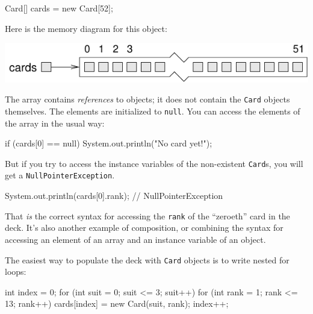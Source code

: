 \documentclass[12pt]{book}
\theoremstyle{exercise}
\newcommand{\java}[1]{\verb"#1"}
\newcommand{\java}[1]{\lstinline{#1}} %
\begin{document}
\begin{code}
    Card[] cards = new Card[52];
\end{code}


Here is the memory diagram for this object:

\begin{center}
\includegraphics{figs/cardarray.pdf}
\end{center}


The array contains {\em references} to objects; it does not contain the \java{Card} objects themselves.
The elements are initialized to \java{null}.
You can access the elements of the array in the usual way:

\begin{code}
    if (cards[0] == null) {
        System.out.println("No card yet!");
    }
\end{code}


But if you try to access the instance variables of the non-existent \java{Card}s, you will get a \java{NullPointerException}.

\begin{code}
    System.out.println(cards[0].rank);  // NullPointerException
\end{code}


That {\em is} the correct syntax for accessing the \java{rank} of the ``zeroeth'' card in the deck.
It's also another example of composition, or combining the syntax for accessing an element of an array and an instance variable of an object.


The easiest way to populate the deck with \java{Card} objects is to write nested for loops:

\begin{code}
    int index = 0;
    for (int suit = 0; suit <= 3; suit++) {
        for (int rank = 1; rank <= 13; rank++) {
            cards[index] = new Card(suit, rank);
            index++;
        }
    }
\end{code}
\end{document}
